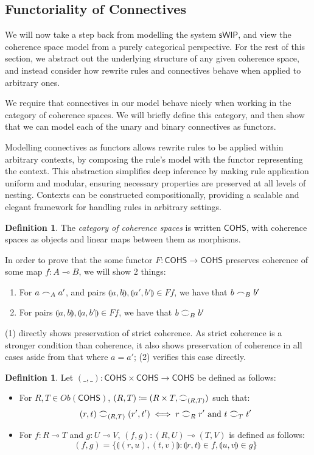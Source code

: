 \documentclass[12pt, oneside]{article}
\theoremstyle{plain}
\theoremstyle{definition}
\newtheorem{definition}[theorem]{Definition}
\newcommand{\lp}{\llparenthesis}
\newcommand{\rp}{\rrparenthesis}
\newcommand{\sSys}{{\mathsf{sWIP}}}%
\newcommand{\cohs}{{\mathsf{COHS}}}
\newcommand{\coh}[1][]{\mathrel{\vcenter{\offinterlineskip\hbox{$\frown$}\vskip0.2ex\hbox{$\smile$}}_{\ifx\\#1\\\else#1\fi}}}
\newcommand{\scoh}[1][]{\mathrel{\frown}_{\ifx\\#1\\\else#1\fi}}
\begin{document}
\subsection{Functoriality of Connectives}

We will now take a step back from modelling the system $\sSys$, and view the coherence space model from a purely categorical perspective.
For the rest of this section, we abstract out the underlying structure of any given coherence space, and instead consider how rewrite rules and connectives behave when applied to arbitrary ones.

We require that connectives in our model behave nicely when working in the category of coherence spaces.
We will briefly define this category, and then show that we can model each of the unary and binary connectives as functors.

Modelling connectives as functors allows rewrite rules to be applied within arbitrary contexts, by composing the rule's model with the functor representing the context.
This abstraction simplifies deep inference by making rule application uniform and modular, ensuring necessary properties are preserved at all levels of nesting.
Contexts can be constructed compositionally, providing a scalable and elegant framework for handling rules in arbitrary settings.

\begin{definition}
    The \textit{category of coherence spaces} is written $\cohs$, with coherence spaces as objects and linear maps between them as morphisms.
\end{definition}

In order to prove that the some functor $F:\cohs\to\cohs$ preserves coherence of some map $f:A\multimap B$, we will show 2 things:
\begin{enumerate}
    \item
    For $a\scoh[A]a'$, and pairs $\lp a,b\rp,\lp a',b'\rp\in Ff$, we have that $b\scoh[B]b'$
    \item 
    For pairs $\lp a,b\rp,\lp a,b'\rp\in Ff$, we have that $b\coh[B]b'$
\end{enumerate}
(1) directly shows preservation of strict coherence. As strict coherence is a stronger condition than coherence, it also shows preservation of coherence in all cases aside from that where $a=a'$;
(2) verifies this case directly.

\begin{definition}
    Let $(\_,\_):\cohs\times\cohs\to\cohs$ be defined as follows:
    \begin{itemize}
        \item
        For $R,T\in Ob(\cohs)$, $(R,T) \coloneqq (R\times T,\coh[(R,T)])$ such that:
        $$(r,t)\coh[(R,T)](r',t')\iff r\coh[R]r'\text{ and }t\coh[T]t'$$

        \item
        For $f:R\multimap T$ and $g:U\multimap V$, 
        $(f,g):(R,U)\multimap(T,V)$ is defined as follows:
        $$(f,g)=\{\lp(r,u),(t,v)\rp:\lp r,t\rp\in f,\lp u,v\rp\in g\}$$
    \end{itemize}
\end{definition}
\end{document}

